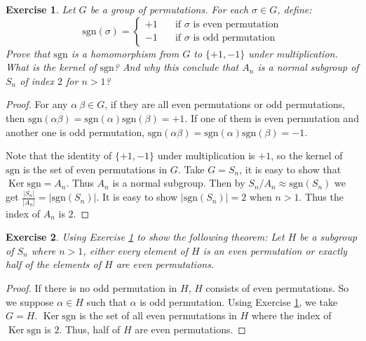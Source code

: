 \documentclass[14pt]{extarticle}
\newtheorem{exercise}{Exercise}[section]
\newcommand{\1}{\{ e \}}
\DeclareMathOperator{\Ker}{Ker}
\begin{document}
{
\newcommand{\sgn}{\mathrm{sgn}}
  
\begin{exercise}
  \label{exc:10.8}
  Let $G$ be a group of permutations. For each $\sigma \in G$, define:
  \[
    \sgn(\sigma) = \begin{cases}
      +1 & \quad \text{if } \sigma \text{ is even permutation} \\
      -1 & \quad \text{if } \sigma \text{ is odd permutation}
    \end{cases}
  \]
  Prove that $\sgn$ is a homomorphism from $G$ to $\{ +1 , -1 \}$ under multiplication.
  What is the kernel of $\sgn$?
  And why this conclude that $A_n$ is a normal subgroup of $S_n$ of index $2$ for $n > 1$?
\end{exercise}
\begin{proof}
  For any $\alpha \ \beta \in G$, if they are all even permutations or odd permutations,
  then $\sgn(\alpha \beta) = \sgn(\alpha) \sgn(\beta) = +1$.
  If one of them is even permutation and another one is odd permutation,
  $\sgn(\alpha \beta) = \sgn(\alpha) \sgn(\beta) = -1$.

  Note that the identity of $\{ +1 , -1 \}$ under multiplication is $+1$,
  so the kernel of $\sgn$ is the set of even permutations in $G$.
  Take $G = S_n$, it is easy to show that $\Ker \sgn = A_n$.
  Thus $A_n$ is a normal subgroup.
  Then by $S_n/A_n \approx \sgn(S_n)$ 
  we get $\displaystyle \frac{|S_n|}{|A_n|} = |\sgn(S_n)|$.
  It is easy to show $|\sgn(S_n)| = 2$ when $n > 1$.
  Thus the index of $A_n$ is $2$.
\end{proof}

\setcounter{section}{5}
\setcounter{exercise}{26}

\begin{exercise}
  Using \textnormal{Exercise \ref{exc:10.8}} to show the following theorem:
  Let $H$ be a subgroup of $S_n$ where $n > 1$, 
  either every element of $H$ is an even permutation or
  exactly half of the elements of $H$ are even permutations.
\end{exercise}
\begin{proof}
  If there is no odd permutation in $H$, $H$ consists of even permutations.
  So we suppose $\alpha \in H$ such that $\alpha$ is odd permutation.
  Using Exercise \ref{exc:10.8}, we take $G = H$. 
  $\Ker \sgn$ is the set of all even permutations in $H$ 
  where the index of $\Ker \sgn$ is $2$. Thus, half of $H$ are even permutations.
\end{proof}

\setcounter{section}{10}
\setcounter{exercise}{8}
}
\end{document}
